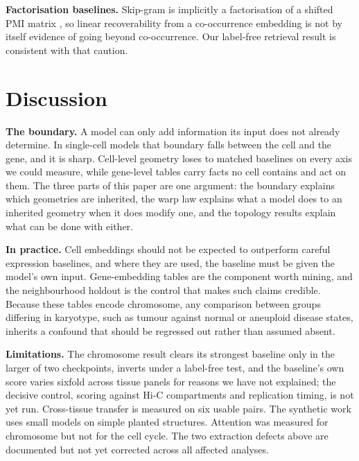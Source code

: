 \documentclass[11pt]{article}
\begin{document}
\textbf{Factorisation baselines.} Skip-gram is implicitly a factorisation of a shifted PMI matrix
\citep{levy2014factorization}, so linear recoverability from a co-occurrence embedding is not by itself
evidence of going beyond co-occurrence. Our label-free retrieval result is consistent with that
caution.

\section{Discussion}

\textbf{The boundary.} A model can only add information its input does not already determine. In
single-cell models that boundary falls between the cell and the gene, and it is sharp. Cell-level
geometry loses to matched baselines on every axis we could measure, while gene-level tables carry facts
no cell contains and act on them. The three parts of this paper are one argument: the boundary explains
which geometries are inherited, the warp law explains what a model does to an inherited geometry when
it does modify one, and the topology results explain what can be done with either.

\textbf{In practice.} Cell embeddings should not be expected to outperform careful expression
baselines, and where they are used, the baseline must be given the model's own input. Gene-embedding
tables are the component worth mining, and the neighbourhood holdout is the control that makes such
claims credible. Because these tables encode chromosome, any comparison between groups differing in
karyotype, such as tumour against normal or aneuploid disease states, inherits a confound that should
be regressed out rather than assumed absent.

\textbf{Limitations.} The chromosome result clears its strongest baseline only in the larger of two
checkpoints, inverts under a label-free test, and the baseline's own score varies sixfold across tissue
panels for reasons we have not explained; the decisive control, scoring against Hi-C compartments and
replication timing, is not yet run. Cross-tissue transfer is measured on six usable pairs. The
synthetic work uses small models on simple planted structures. Attention was measured for chromosome
but not for the cell cycle. The two extraction defects above are documented but not yet corrected
across all affected analyses.
\end{document}
